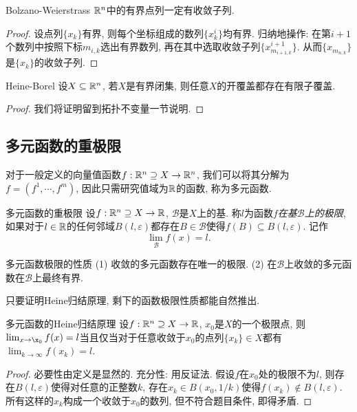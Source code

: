 \begin{theorem}{Bolzano-Weierstrass}
	$\mathbb{R} ^n$中的有界点列一定有收敛子列. 
\end{theorem}
\begin{proof}
	设点列$\{ x_k \}$有界, 则每个坐标组成的数列$\{ x^i_k \}$均有界. 归纳地操作: 在第$i+1$个数列中按照下标$m_{{i,k}}$选出有界数列, 再在其中选取收敛子列$\{ x^{i+1}_{m_{i+1,k}} \}$. 从而$\{ x_{m_{n,k}} \}$是$\{ x_k \}$的收敛子列. 
\end{proof}

\begin{theorem}{Heine-Borel}
	设$X \subseteq \mathbb{R} ^n$, 若$X$是有界闭集, 则任意$X$的开覆盖都存在有限子覆盖. 
\end{theorem}
\begin{proof}
	我们将证明留到拓扑不变量一节说明. 
\end{proof}

\subsection{多元函数的重极限}

对于一般定义的向量值函数$f:\mathbb{R} ^n \supseteq X \to \mathbb{R} ^n$, 我们可以将其分解为$f=(f^1,\cdots ,f^m)$, 因此只需研究值域为$\mathbb{R}$的函数, 称为多元函数. 

\begin{definition}{多元函数的重极限}
	设$f: \mathbb{R} ^n \supseteq X \to \mathbb{R}$, $\mathcal{B}$是$X$上的基. 称$l$为函数$f$\textit{在基$\mathcal{B}$上的极限}, 如果对于$l \in \mathbb{R}$的任何邻域$B(l,\varepsilon)$都存在$B \in \mathcal{B}$使得$f(B) \subseteq B(l,\varepsilon)$. 记作$$\lim_{\mathcal{B}}f(x)=l.$$
\end{definition}

\begin{proposition}{多元函数极限的性质}
	(1) 收敛的多元函数存在唯一的极限. \qquad (2) 在$\mathcal{B}$上收敛的多元函数在$\mathcal{B}$上最终有界. 
\end{proposition}

只要证明Heine归结原理, 剩下的函数极限性质都能自然推出. 

\begin{theorem}{多元函数的Heine归结原理}
	设$f: \mathbb{R} ^n \supseteq X \to \mathbb{R}$, $x_0$是$X$的一个极限点, 则$\lim_{x\to \x_0}f(x)=l$当且仅当对于任意收敛于$x_0$的点列$\{ x_k \} \in X$都有$\lim_{k\to \infty} f(x_k)=l$. 
\end{theorem}
\begin{proof}
	必要性由定义是显然的. 充分性: 用反证法. 假设$f$在$x_0$处的极限不为$l$, 则存在$B(l,\varepsilon)$使得对任意的正整数$k$, 存在$x_k \in B(x_0,1/k)$使得$f(x_k) \notin B(l,\varepsilon)$. 所有这样的$x_k$构成一个收敛于$x_0$的数列, 但不符合题目条件, 即得矛盾. 
\end{proof}

